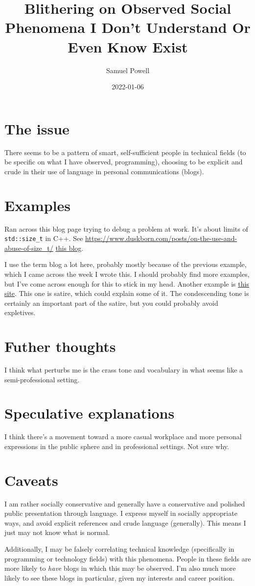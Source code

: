 \documentclass[11pt]{article} %
\title{Blithering on Observed Social Phenomena I Don't Understand Or Even Know Exist}
\author{Samuel Powell}
\date{2022-01-06} %
\begin{document}
\maketitle

\section{The issue}
There seems to be a pattern of smart, self-sufficient people in technical fields (to be specific on what I have observed,
 programming), choosing to be explicit and crude in their use of language in personal communications (blogs).
 
 \section{Examples}
 Ran across this blog page trying to debug a problem at work. It's about limits of \verb|std::size_t| in C++. See \url{https://www.duskborn.com/posts/on-the-use-and-abuse-of-size_t/} \href{https://www.duskborn.com/posts/on-the-use-and-abuse-of-size_t/}{this  blog}.
 
 I use the term blog a lot here, probably mostly because of the previous example, which I came across the week I wrote this. 
 I should probably find more examples, but I've come across enough for this to stick in my head. Another example is
 \href{https://www/motherfuckingwebsite.com}{this site}. This one is satire, which could explain some of it. The condescending 
 tone is certainly an important part of the satire, but you could probably avoid expletives. 
 
 \section{Futher thoughts}
 I think what perturbs me is the crass tone and vocabulary in what seems like a semi-professional setting. 
 
 \section{Speculative explanations}
 I think there's a movement toward a more casual workplace and more personal expressions in the public sphere and in 
 professional settings. Not sure why. 
 
 
 
 \section{Caveats}
 I am rather socially conservative and generally have a conservative and polished public presentation through language. 
 I express myself in socially appropriate ways, and avoid explicit references and crude language (generally). This means 
 I just may not know what is normal.
 
 Additionally, I may be falsely correlating technical knowledge (specifically in programming or technology fields) with this 
 phenomena. People in these fields are more likely to \emph{have} blogs in which this may be observed. I'm also much more likely 
 to see these blogs in particular, given my interests and career position.
 
 


\printbibliography
\end{document}
